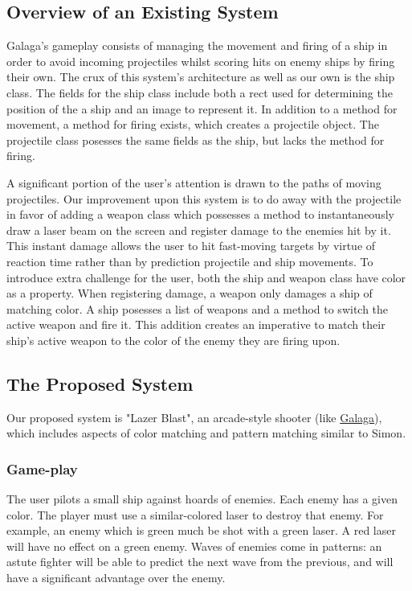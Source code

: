 \subsection*{Overview of an Existing System}
Galaga's gameplay consists of managing the movement and firing of a ship in
order to avoid incoming projectiles whilst scoring hits on enemy ships by firing
their own. The crux of this system's architecture as well as our own is the ship
class. The fields for the ship class include both a rect used for determining
the position of the a ship and an image to represent it. In addition to a method
for movement, a method for firing exists, which creates a projectile object. The
projectile class posesses the same fields as the ship, but lacks the method for
firing.

A significant portion of the user's attention is drawn to the paths of moving
projectiles. Our improvement upon this system is to do away with the projectile
in favor of adding a weapon class which possesses a method to instantaneously 
draw a laser beam on the screen and register damage to the enemies hit by it. 
This instant damage allows the user to hit fast-moving targets by virtue of 
reaction time rather than by prediction projectile and ship movements. To 
introduce extra challenge for the user, both the ship and weapon class have
color as a property. When registering damage, a weapon only damages a ship of
matching color. A ship posesses a list of weapons and a method to switch
the active weapon and fire it. This addition creates an imperative to match
their ship's active weapon to the color of the enemy they are firing upon. 

\subsection*{The Proposed System}
Our proposed system is "Lazer Blast", an arcade-style shooter (like
\href{https://en.wikipedia.org/wiki/Galaga}{Galaga}), which includes
aspects of color matching and pattern matching similar to Simon.

\subsubsection*{Game-play}
The user pilots a small ship against hoards of enemies.  Each enemy
has a given color.  The player must use a similar-colored laser to
destroy that enemy.  For example, an enemy which is green much be
shot with a green laser.  A red laser will have no effect on a green enemy.
Waves of enemies come in patterns: an astute fighter will be able to
predict the next wave from the previous, and will have a significant
advantage over the enemy.

